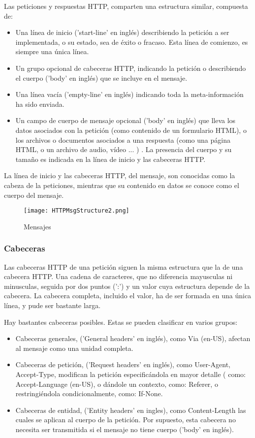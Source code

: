 Las peticiones y respuestas HTTP, comparten una estructura similar, compuesta de:

\begin{itemize}
\item Una línea de inicio ('start-line' en inglés) describiendo la petición a ser implementada, o su estado, sea de éxito o fracaso. Esta línea de comienzo, es siempre una única línea.
\item Un grupo opcional de cabeceras HTTP, indicando la petición o describiendo el cuerpo ('body' en inglés) que se incluye en el mensaje. 
\item Una línea vacía ('empty-line' en inglés) indicando toda la meta-información ha sido enviada.
\item Un campo de cuerpo de mensaje opcional ('body' en inglés) que lleva los datos asociados con la petición (como contenido de un formulario HTML), o los archivos o documentos asociados a una respuesta (como una página HTML, o un archivo de audio, vídeo ... ) . La presencia del cuerpo y su tamaño es indicada en la línea de inicio y las cabeceras HTTP.
\end{itemize}

La línea de inicio y las cabeceras HTTP, del mensaje, son conocidas como la cabeza de la peticiones, mientras que su contenido en datos se conoce como el cuerpo del mensaje.

\begin{figure}[H]
	\center
	\texttt{[image: HTTPMsgStructure2.png]}
	\caption{Mensajes}
	\label{fig:super}
\end{figure}

\subsubsection{Cabeceras}

Las cabeceras HTTP  de una petición siguen la misma estructura que la de una cabecera HTTP. Una cadena de caracteres, que no diferencia mayusculas ni minusculas, seguida por dos puntos  (':')  y un valor cuya estructura depende de la cabecera. La cabecera completa, incluido el valor, ha de ser formada en una única línea, y pude ser bastante larga. 

Hay bastantes cabeceras posibles. Estas se pueden clasificar en varios grupos: 
\begin{itemize}
	\item Cabeceras generales, ('General headers' en inglés), como Via (en-US),  afectan al mensaje como una unidad completa.
	\item Cabeceras de petición, ('Request headers' en inglés), como User-Agent, Accept-Type, modifican la petición especificándola en mayor detalle ( como: Accept-Language (en-US), o dándole un contexto, como:  Referer, o restringiéndola condicionalmente, como: If-None.
	\item Cabeceras de entidad, ('Entity headers' en ingles), como Content-Length las cuales se aplican al cuerpo de la petición. Por supuesto, esta cabecera no necesita ser transmitida si el mensaje no tiene cuerpo ('body' en inglés). 
\end{itemize}

